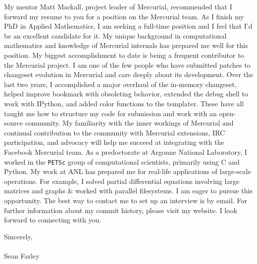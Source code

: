 \documentclass[]{fancy-cv}
\begin{document}
My mentor Matt Mackall, project leader of Mercurial, recommended that I forward
my resume to you for a position on the Mercurial team. As I finish my PhD in
Applied Mathematics, I am seeking a full-time position and I feel that I’d be
an excellent candidate for it.
%
\newline\newline
%
My unique background in computational mathematics and knowledge of Mercurial
internals has prepared me well for this position. My biggest accomplishment to
date is being a frequent contributor to the Mercurial project. I am one of the
few people who have submitted patches to changeset evolution in Mercurial and
care deeply about its development.
%
\newline\newline
%
Over the last two years, I accomplished a major overhaul of the in-memory
changeset, helped improve bookmark with obsoleting behavior, extended the debug
shell to work with IPython, and added color functions to the templater. These
have all taught me how to structure my code for submission and work with an
open-source community. My familiarity with the inner workings of Mercurial and
continual contribution to the community with Mercurial extensions, IRC
participation, and advocacy will help me succeed at integrating with the
Facebook Mercurial team.
%
\newline\newline
%
As a predoctorate at Argonne National Laboratory, I worked in the
\texttt{PETSc} group of computational scientists, primarily using C and
Python. My work at ANL has prepared me for real-life applications of
large-scale operations. For example, I solved partial differential equations
involving large matrices and graphs \& worked with parallel filesystems.
%
\newline\newline
%
I am eager to pursue this opportunity. The best way to contact me to set up an
interview is by email. For further information about my commit history, please
visit my website. I look forward to connecting with you.

\vspace{2em}
Sincerely,\\
\\
Sean Farley
\end{document}
